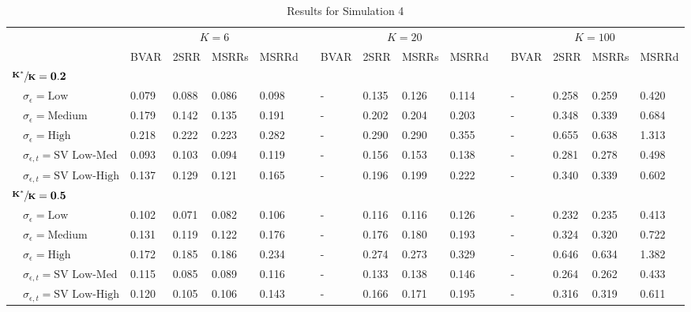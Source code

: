 \begin{table}[!tbp]
\caption{Results for Simulation 4\label{s1_table}} 
\begin{center}
\begin{tabular}{lllllcllllcllll}
\hline\hline
\multicolumn{1}{l}{\bfseries }&\multicolumn{4}{c}{\bfseries $K=6$}&\multicolumn{1}{c}{\bfseries }&\multicolumn{4}{c}{\bfseries $K=20$}&\multicolumn{1}{c}{\bfseries }&\multicolumn{4}{c}{\bfseries $K=100$}\tabularnewline
\cline{2-5} \cline{7-10} \cline{12-15}
\multicolumn{1}{l}{}&\multicolumn{1}{c}{BVAR}&\multicolumn{1}{c}{2SRR}&\multicolumn{1}{c}{MSRRs}&\multicolumn{1}{c}{MSRRd}&\multicolumn{1}{c}{}&\multicolumn{1}{c}{BVAR}&\multicolumn{1}{c}{2SRR}&\multicolumn{1}{c}{MSRRs}&\multicolumn{1}{c}{MSRRd}&\multicolumn{1}{c}{}&\multicolumn{1}{c}{BVAR}&\multicolumn{1}{c}{2SRR}&\multicolumn{1}{c}{MSRRs}&\multicolumn{1}{c}{MSRRd}\tabularnewline
\hline
{\bfseries $\mathbf{\sfrac{K^*}{K}=0.2}$}&&&&&&&&&&&&&&\tabularnewline
~~$\sigma_{\epsilon} =\text{Low}$& 0.079& 0.088& 0.086& 0.098&&-& 0.135& 0.126& 0.114&&-& 0.258& 0.259& 0.420\tabularnewline
~~$\sigma_{\epsilon} =\text{Medium}$& 0.179& 0.142& 0.135& 0.191&&-& 0.202& 0.204& 0.203&&-& 0.348& 0.339& 0.684\tabularnewline
~~$\sigma_{\epsilon} =\text{High}$& 0.218& 0.222& 0.223& 0.282&&-& 0.290& 0.290& 0.355&&-& 0.655& 0.638& 1.313\tabularnewline
~~$\sigma_{\epsilon,t} = \text{SV Low-Med}$& 0.093& 0.103& 0.094& 0.119&&-& 0.156& 0.153& 0.138&&-& 0.281& 0.278& 0.498\tabularnewline
~~$\sigma_{\epsilon,t}  = \text{SV Low-High}$& 0.137& 0.129& 0.121& 0.165&&-& 0.196& 0.199& 0.222&&-& 0.340& 0.339& 0.602\tabularnewline
\hline
{\bfseries $\mathbf{\sfrac{K^*}{K}=0.5}$}&&&&&&&&&&&&&&\tabularnewline
~~$\sigma_{\epsilon} =\text{Low}$& 0.102& 0.071& 0.082& 0.106&&-& 0.116& 0.116& 0.126&&-& 0.232& 0.235& 0.413\tabularnewline
~~$\sigma_{\epsilon} =\text{Medium}$& 0.131& 0.119& 0.122& 0.176&&-& 0.176& 0.180& 0.193&&-& 0.324& 0.320& 0.722\tabularnewline
~~$\sigma_{\epsilon} =\text{High}$& 0.172& 0.185& 0.186& 0.234&&-& 0.274& 0.273& 0.329&&-& 0.646& 0.634& 1.382\tabularnewline
~~$\sigma_{\epsilon,t} = \text{SV Low-Med}$& 0.115& 0.085& 0.089& 0.116&&-& 0.133& 0.138& 0.146&&-& 0.264& 0.262& 0.433\tabularnewline
~~$\sigma_{\epsilon,t}  = \text{SV Low-High}$& 0.120& 0.105& 0.106& 0.143&&-& 0.166& 0.171& 0.195&&-& 0.316& 0.319& 0.611\tabularnewline

\end{tabular}
\end{center}
\end{table}
